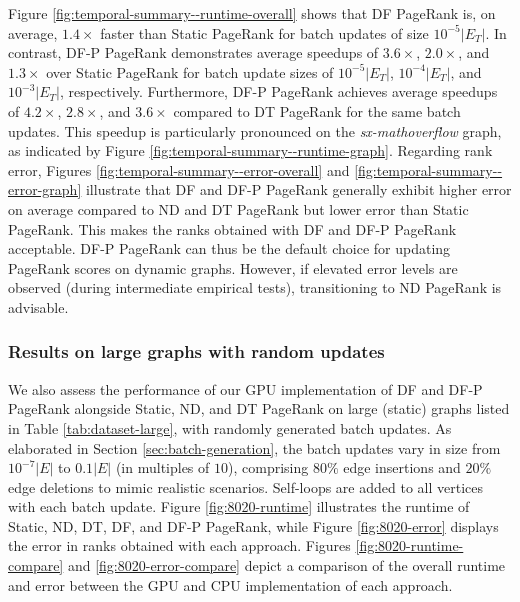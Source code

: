 Figure \ref{fig:temporal-summary--runtime-overall} shows that DF PageRank is, on average, $1.4\times$ faster than Static PageRank for batch updates of size $10^{-5}|E_T|$. In contrast, DF-P PageRank demonstrates average speedups of $3.6\times$, $2.0\times$, and $1.3\times$ over Static PageRank for batch update sizes of $10^{-5}|E_T|$, $10^{-4}|E_T|$, and $10^{-3}|E_T|$, respectively. Furthermore, DF-P PageRank achieves average speedups of $4.2\times$, $2.8\times$, and $3.6\times$ compared to DT PageRank for the same batch updates. This speedup is particularly pronounced on the \textit{sx-mathoverflow} graph, as indicated by Figure \ref{fig:temporal-summary--runtime-graph}. Regarding rank error, Figures \ref{fig:temporal-summary--error-overall} and \ref{fig:temporal-summary--error-graph} illustrate that DF and DF-P PageRank generally exhibit higher error on average compared to ND and DT PageRank but lower error than Static PageRank. This makes the ranks obtained with DF and DF-P PageRank acceptable. DF-P PageRank can thus be the default choice for updating PageRank scores on dynamic graphs. However, if elevated error levels are observed (during intermediate empirical tests), transitioning to ND PageRank is advisable.




\subsubsection{Results on large graphs with random updates}

We also assess the performance of our GPU implementation of DF and DF-P PageRank alongside Static, ND, and DT PageRank on large (static) graphs listed in Table \ref{tab:dataset-large}, with randomly generated batch updates. As elaborated in Section \ref{sec:batch-generation}, the batch updates vary in size from $10^{-7}|E|$ to $0.1|E|$ (in multiples of $10$), comprising $80\%$ edge insertions and $20\%$ edge deletions to mimic realistic scenarios. Self-loops are added to all vertices with each batch update. Figure \ref{fig:8020-runtime} illustrates the runtime of Static, ND, DT, DF, and DF-P PageRank, while Figure \ref{fig:8020-error} displays the error in ranks obtained with each approach. Figures \ref{fig:8020-runtime-compare} and \ref{fig:8020-error-compare} depict a comparison of the overall runtime and error between the GPU and CPU implementation of each approach.





